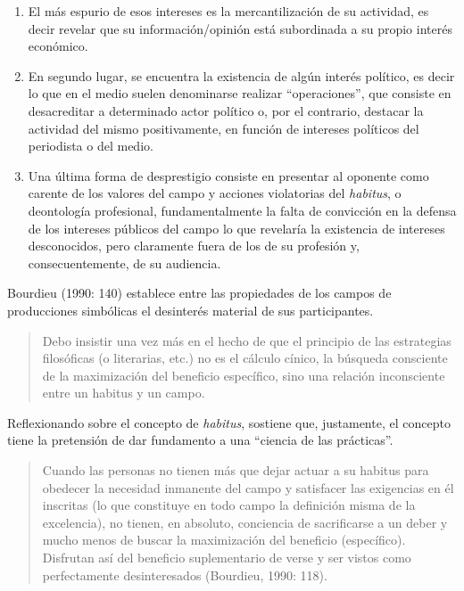 \begin{enumerate}
\def\labelenumi{\alph{enumi})}
\item
  El más espurio de esos intereses es la mercantilización de su actividad, es decir revelar que su información/opinión está subordinada a su propio interés económico.
\item
  En segundo lugar, se encuentra la existencia de algún interés político, es decir lo que en el medio suelen denominarse realizar ``operaciones'', que consiste en desacreditar a determinado actor político o, por el contrario, destacar la actividad del mismo positivamente, en función de intereses políticos del periodista o del medio.
\item
  Una última forma de desprestigio consiste en presentar al oponente como carente de los valores del campo y acciones violatorias del \emph{habitus}, o deontología profesional, fundamentalmente la falta de convicción en la defensa de los intereses públicos del campo  lo que revelaría la existencia de intereses desconocidos, pero claramente fuera de los de su profesión y, consecuentemente, de su audiencia.
\end{enumerate}

Bourdieu (1990: 140) establece entre las propiedades de los campos de producciones simbólicas el desinterés material de sus participantes.

\begin{quote}
Debo insistir una vez más en el hecho de que el principio de las estrategias filosóficas (o literarias, etc.) no es el cálculo cínico, la búsqueda consciente de la maximización del beneficio específico, sino una relación inconsciente entre un habitus y un campo.
\end{quote}

Reflexionando sobre el concepto de \emph{habitus}, sostiene que, justamente, el concepto tiene la pretensión de dar fundamento a una ``ciencia de las prácticas''.

\begin{quote}
Cuando las personas no tienen más que dejar actuar a su habitus para obedecer la necesidad inmanente del campo y satisfacer las exigencias en él inscritas (lo que constituye en todo campo la definición misma de la excelencia), no tienen, en absoluto, conciencia de sacrificarse a un deber y mucho menos de buscar la maximización del beneficio (específico). Disfrutan así del beneficio suplementario de verse y ser vistos como perfectamente desinteresados (Bourdieu, 1990: 118).
\end{quote}


